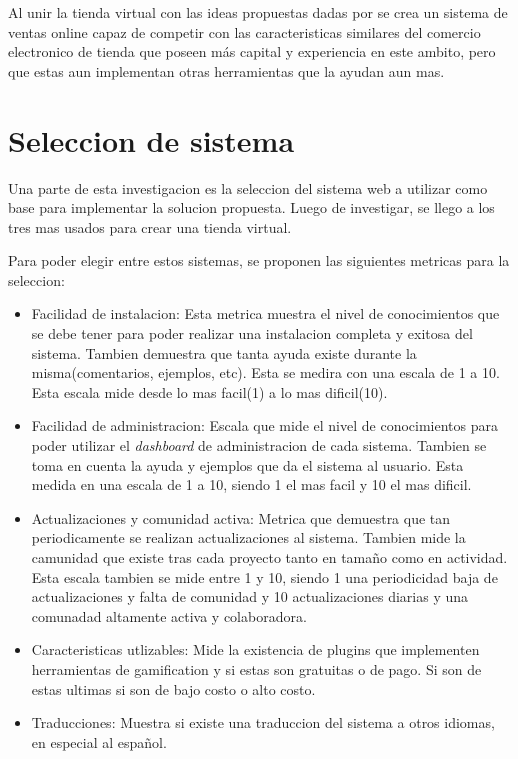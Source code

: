 Al unir la tienda virtual con las ideas propuestas dadas por {\GAM} se crea un
sistema de ventas online capaz de competir con las caracteristicas similares del 
comercio electronico de tienda que poseen más capital y experiencia en este ambito, pero
que estas aun implementan otras herramientas que la ayudan aun mas.

\section{Seleccion de sistema}

Una parte de esta investigacion es la seleccion del sistema web a utilizar como base para
implementar la solucion propuesta. Luego de investigar, se llego a los tres mas usados
para crear una tienda virtual.

Para poder elegir entre estos sistemas, se proponen las siguientes metricas para la seleccion:


\begin{itemize}

\item Facilidad de instalacion: Esta metrica muestra el nivel de conocimientos que se debe
tener para poder realizar una instalacion completa y exitosa del sistema. Tambien demuestra
que tanta ayuda existe durante la misma(comentarios, ejemplos, etc). Esta se medira con una escala
de 1 a 10. Esta escala mide desde lo mas facil(1) a lo mas dificil(10).
\item Facilidad de administracion: Escala que mide el nivel de conocimientos para poder
utilizar el \emph{dashboard} de administracion de cada sistema. Tambien se toma en cuenta
la ayuda y ejemplos que da el sistema al usuario. Esta medida en una escala de 1 a 10, siendo 1 el
mas facil y 10 el mas dificil.
\item Actualizaciones y comunidad activa: Metrica que demuestra que tan periodicamente
se realizan actualizaciones al sistema. Tambien mide la camunidad que existe tras cada proyecto
tanto en tamaño como en actividad. Esta escala tambien se mide entre 1 y 10, siendo 1 una periodicidad
baja de actualizaciones y falta de comunidad y 10 actualizaciones diarias y una comunadad altamente 
activa y colaboradora.
\item Caracteristicas utlizables: Mide la existencia de plugins que implementen herramientas
 de gamification y si estas son gratuitas o de pago. Si son de estas ultimas si son de bajo 
costo o alto costo.
\item Traducciones: Muestra si existe una traduccion del sistema a otros idiomas, en especial al 
español. 

\end{itemize}

